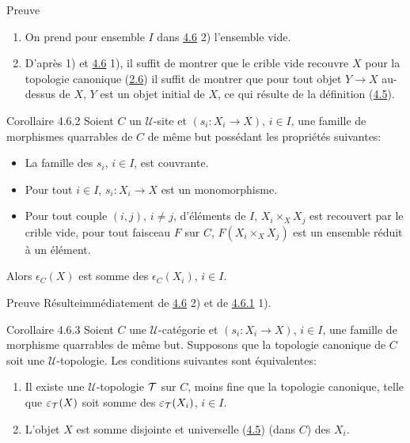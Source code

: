 \documentclass[10pt]{../fichiers-configuration-latex/smfart}
\begin{document}
\begin{enonce*}[remark]{Preuve}
\begin{enumerate}
\renewcommand{\labelenumi}{\theenumi)}
\item On prend pour ensemble $I$ dans \hyperref[II.prop4.6]{4.6} 2) l'ensemble vide.

\item D'après 1) et \hyperref[II.prop4.6]{4.6} 1), il suffit de montrer que le crible vide
  recouvre $X$ pour la topologie canonique \ie (\hyperref[II.prop2.6]{2.6}) il suffit de
  montrer que pour tout objet $Y\rightarrow X$ au-dessus de $X$, $Y$
  est un objet initial de $X$, ce qui résulte de la définition (\hyperref[II.def4.5]{4.5}).
\end{enumerate}
\end{enonce*}

\begin{enonce*}{Corollaire 4.6.2}
Soient $C$ un $𝒰$-site et $(s_i:X_i\rightarrow X)$, $i\in
I$, une famille de morphismes quarrables de $C$ de même but
possédant les propriétés suivantes:
\begin{itemize}
\item[$\alpha)$] La famille des $s_i$, $i\in I$, est couvrante.

\item[$\beta)$] Pour tout $i\in I$, $s_i:X_i\rightarrow X$ est un
  monomorphisme.

\item[$\gamma)$] Pour tout couple $(i,j)$, $i\neq j$, d'éléments
  de $I$, $X_i\times_X X_j$ est recouvert par le crible vide, \ie pour
  tout faisceau $F$ sur $C$, $F(X_i\times_X X_j)$ est un ensemble
  réduit à un élément.
\end{itemize}
Alors $\epsilon_C(X)$ est somme des $\epsilon_C(X_i)$, $i\in I$.
\end{enonce*}

\begin{enonce*}[remark]{Preuve}
Résulte\pageoriginale immédiatement de \hyperref[II.prop4.6]{4.6} 2) et de
\hyperref[II.cor4.6.1]{4.6.1} 1).
\end{enonce*}

\begin{enonce*}{Corollaire 4.6.3}
Soient $C$ une $𝒰$-catégorie et $(s_i:X_i\rightarrow X)$,
$i\in I$, une famille de morphisme quarrables de même but.
Supposons que la topologie canonique de $C$ soit une
$𝒰$-topologie. Les conditions suivantes sont équivalentes:
\begin{enumerate}
\renewcommand{\theenumi}{\roman{enumi}}
\renewcommand{\labelenumi}{\theenumi)}
\item Il existe une $𝒰$-topologie ${\mathcal T}$ sur $C$, moins
  fine que la topologie canonique, telle que
  $\varepsilon_{{\mathcal T}}(X)$ soit somme des
  $\varepsilon_{{\mathcal T}}(X_i)$, $i\in I$.

\item L'objet $X$ est somme disjointe et universelle (\hyperref[II.def4.5]{4.5}) (dans
  $C$) des $X_i$.
\end{enumerate}
\end{enonce*}
\end{document}
